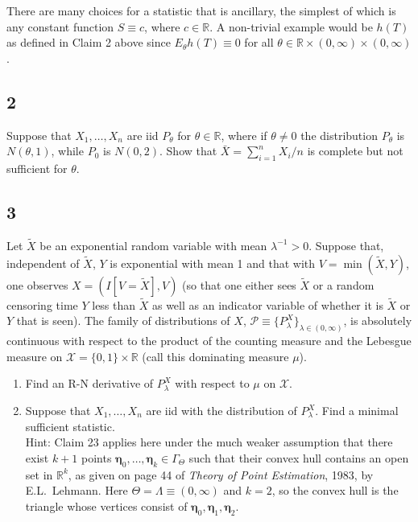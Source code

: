 \documentclass[12pt]{article}
\begin{document}
There are many choices for a statistic that is ancillary, the simplest of which is any constant function $S \equiv c$, where $c \in \mathbb{R}$.
A non-trivial example would be $h(T)$ as defined in Claim 2 above since $E_{\theta}h(T) \equiv 0$ for all $\theta \in
\mathbb{R}\times(0,\infty)\times(0,\infty)$.


\newpage
\subsection*{2}
\begin{tcolorbox}
Suppose that $X_1,\ldots,X_n$ are iid $P_\theta$ for $\theta \in \mathbb{R}$, where if $\theta \neq 0$ the distribution $P_\theta$ is $N(\theta,1)$, while $P_0$ is $N(0,2)$.  Show that $\bar{X}=\sum_{i=1}^n X_i/n$ is complete but not sufficient for $\theta$.
\end{tcolorbox}


\subsection*{3}
\begin{tcolorbox}
Let $\tilde{X}$ be an exponential random variable with mean $\lambda^{-1}>0$.    Suppose that, independent of $\tilde{X}$, $Y$ is exponential with mean 1
and that with $V = \min(\tilde{X},Y)$, one observes $X=(I[V=\tilde{X}],V)$ (so that one either sees $\tilde{X}$ or a random censoring time $Y$
less than $\tilde{X}$ as well as an indicator variable of whether it is $\tilde{X}$ or $Y$ that is seen).
The family of distributions of $X$, $\mathcal{P}\equiv \{P^X_\lambda\}_{\lambda \in (0,\infty)}$, is absolutely continuous with respect to the
product of the counting measure and the Lebesgue measure on $\mathcal{X}=\{0,1\}\times \mathbb{R}$ (call this dominating measure $\mu$).
\begin{enumerate}
  \item Find an R-N derivative of $P_\lambda^X$ with respect to $\mu$ on $\mathcal{X}$.
  \item Suppose that $X_1,\ldots,X_n$ are iid with the distribution of $P_\lambda^X$.  Find a minimal sufficient statistic. \\
    Hint: Claim 23 applies here under the much weaker assumption that there exist $k+1$ points $\bm{\eta}_0,\ldots,\bm{\eta}_k\in \Gamma_\Theta$ such
    that their convex hull contains an open set in $\mathbb{R}^k$, as given on page 44 of {\it Theory of Point Estimation}, 1983, by E.L.~Lehmann.  Here $\Theta=\Lambda \equiv (0,\infty)$ and $k=2$, so the convex hull is the triangle whose vertices consist of $\bm{\eta}_0,\bm{\eta}_1,\bm{\eta}_2$.
\end{enumerate}
\end{tcolorbox}
\end{document}
